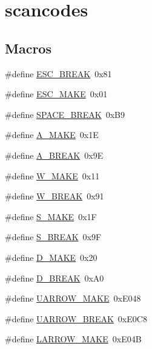 \hypertarget{group__scancodes}{}\section{scancodes}
\label{group__scancodes}
\subsection*{Macros}
\begin{DoxyCompactItemize}
\item 
\#define \hyperlink{group__scancodes_ga343f44cb034d2d2ff3438b3d45dcde1f}{E\+S\+C\+\_\+\+B\+R\+E\+AK}~0x81
\item 
\#define \hyperlink{group__scancodes_ga168fd0a54619731c76c386a7f1bde2b1}{E\+S\+C\+\_\+\+M\+A\+KE}~0x01
\item 
\#define \hyperlink{group__scancodes_ga95d6e4b61bac77469ecc47b205709af6}{S\+P\+A\+C\+E\+\_\+\+B\+R\+E\+AK}~0x\+B9
\item 
\#define \hyperlink{group__scancodes_ga0f76fe84c649e8cf3a4114d0d9bf085a}{A\+\_\+\+M\+A\+KE}~0x1E
\item 
\#define \hyperlink{group__scancodes_ga05826112c5acf959ee58dcacd8e9d065}{A\+\_\+\+B\+R\+E\+AK}~0x9E
\item 
\#define \hyperlink{group__scancodes_gac822a3953d90207e64b58f480454a8d8}{W\+\_\+\+M\+A\+KE}~0x11
\item 
\#define \hyperlink{group__scancodes_ga32d11f9abffe8bb3df11feef5ca5213d}{W\+\_\+\+B\+R\+E\+AK}~0x91
\item 
\#define \hyperlink{group__scancodes_gac2c2b345d42f2a5b5a028028eb8c5680}{S\+\_\+\+M\+A\+KE}~0x1F
\item 
\#define \hyperlink{group__scancodes_ga85b3c65b8b6c952e08c252e9737b74f9}{S\+\_\+\+B\+R\+E\+AK}~0x9F
\item 
\#define \hyperlink{group__scancodes_ga629b0c93e278a4bf1e1678af58fbea95}{D\+\_\+\+M\+A\+KE}~0x20
\item 
\#define \hyperlink{group__scancodes_gad2db9242348c43c781cc14746060470b}{D\+\_\+\+B\+R\+E\+AK}~0x\+A0
\item 
\#define \hyperlink{group__scancodes_ga4c8f4d4420f9ec7ef30de25264efa68a}{U\+A\+R\+R\+O\+W\+\_\+\+M\+A\+KE}~0x\+E048
\item 
\#define \hyperlink{group__scancodes_ga9ab3dee73aef06dca9ef9b37b818acb2}{U\+A\+R\+R\+O\+W\+\_\+\+B\+R\+E\+AK}~0x\+E0\+C8
\item 
\#define \hyperlink{group__scancodes_gad9509ca6995b9d5ca117d0ea8004cfef}{L\+A\+R\+R\+O\+W\+\_\+\+M\+A\+KE}~0x\+E04B

\end{DoxyCompactItemize}
